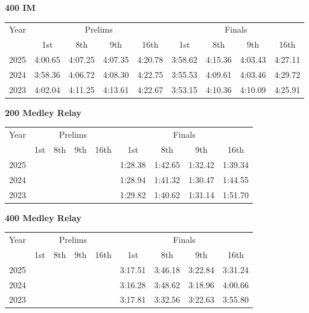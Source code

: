 \textbf{400 IM}

\begin{flushleft}
\begin{tabular}{|c|c|c|c|c|c|c|c|c|}
\hline
Year & \multicolumn{4}{c|}{Prelims} & \multicolumn{4}{c|}{Finals} \\
\cline{2-9}
& 1st & 8th & 9th & 16th & 1st & 8th & 9th & 16th \\
\hline
2025 & 4:00.65 & 4:07.25 & 4:07.35 & 4:20.78 & 3:58.62 & 4:15.36 & 4:03.43 & 4:27.11 \\
2024 & 3:58.36 & 4:06.72 & 4:08.30 & 4:22.75 & 3:55.53 & 4:09.61 & 4:03.46 & 4:29.72 \\
2023 & 4:02.04 & 4:11.25 & 4:13.61 & 4:22.67 & 3:53.15 & 4:10.36 & 4:10.09 & 4:25.91 \\
\hline
\end{tabular}
\end{flushleft}

\textbf{200 Medley Relay}

\begin{flushleft}
\begin{tabular}{|c|c|c|c|c|c|c|c|c|}
\hline
Year & \multicolumn{4}{c|}{Prelims} & \multicolumn{4}{c|}{Finals} \\
\cline{2-9}
& 1st & 8th & 9th & 16th & 1st & 8th & 9th & 16th \\
\hline
2025 &  &  &  &  & 1:28.38 & 1:42.65 & 1:32.42 & 1:39.34 \\
2024 &  &  &  &  & 1:28.94 & 1:41.32 & 1:30.47 & 1:44.55 \\
2023 &  &  &  &  & 1:29.82 & 1:40.62 & 1:31.14 & 1:51.70 \\
\hline
\end{tabular}
\end{flushleft}

\textbf{400 Medley Relay}

\begin{flushleft}
\begin{tabular}{|c|c|c|c|c|c|c|c|c|}
\hline
Year & \multicolumn{4}{c|}{Prelims} & \multicolumn{4}{c|}{Finals} \\
\cline{2-9}
& 1st & 8th & 9th & 16th & 1st & 8th & 9th & 16th \\
\hline
2025 &  &  &  &  & 3:17.51 & 3:46.18 & 3:22.84 & 3:31.24 \\
2024 &  &  &  &  & 3:16.28 & 3:48.62 & 3:18.96 & 4:00.66 \\
2023 &  &  &  &  & 3:17.81 & 3:32.56 & 3:22.63 & 3:55.80 \\
\hline
\end{tabular}
\end{flushleft}

